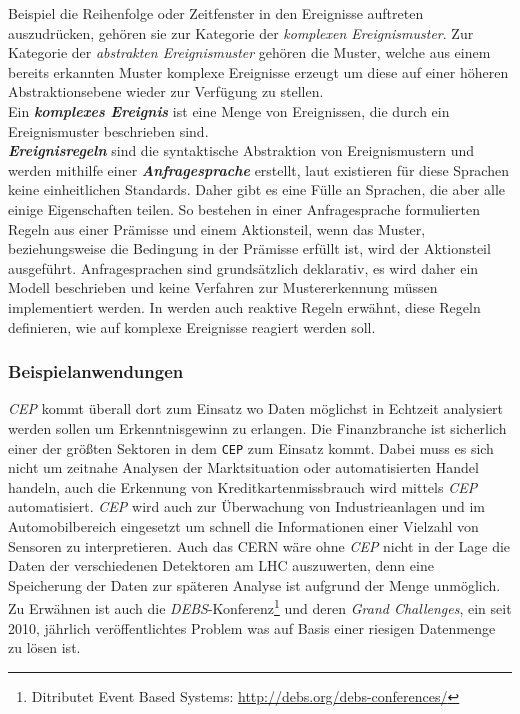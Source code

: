 \documentclass{acm_proc_article-sp}
\begin{document}
Beispiel die Reihenfolge oder Zeitfenster in den Ereignisse auftreten auszudrücken, 
gehören sie zur Kategorie der \textit{komplexen Ereignismuster}. Zur Kategorie der 
\textit{abstrakten Ereignismuster} gehören die Muster, welche aus einem bereits erkannten 
Muster komplexe Ereignisse erzeugt um diese auf einer höheren Abstraktionsebene wieder 
zur Verfügung zu stellen.\\
Ein \textbf{\textit{komplexes Ereignis}} ist eine Menge von Ereignissen, die durch ein 
Ereignismuster beschrieben sind.\\\label{begriff-ereignisregel}
\textbf{\textit{Ereignisregeln}} sind die syntaktische Abstraktion von Ereignismustern 
und werden mithilfe einer \textbf{\textit{Anfragesprache}} erstellt, laut \cite{bruns} 
existieren für diese 
Sprachen keine einheitlichen Standards. Daher gibt es eine Fülle an Sprachen, die aber 
alle einige Eigenschaften teilen. So bestehen in einer Anfragesprache formulierten 
Regeln aus einer Prämisse und einem Aktionsteil, wenn das Muster, beziehungsweise die 
Bedingung in der Prämisse erfüllt ist, wird der Aktionsteil ausgeführt. Anfragesprachen 
sind grundsätzlich deklarativ, es wird daher ein Modell beschrieben und keine Verfahren 
zur Mustererkennung müssen implementiert werden. In \cite{eckert} werden auch reaktive 
Regeln erwähnt, 
diese Regeln definieren, wie auf komplexe Ereignisse reagiert werden soll.

\subsubsection{Beispielanwendungen}
\vspace{0.1cm}

\textit{CEP} kommt überall dort zum Einsatz wo Daten möglichst in Echtzeit analysiert 
werden sollen um Erkenntnisgewinn zu erlangen. Die Finanzbranche ist sicherlich einer der 
größten Sektoren in dem \texttt{CEP} zum Einsatz kommt. Dabei muss es sich nicht um 
zeitnahe Analysen der Marktsituation oder automatisierten Handel handeln, auch die 
Erkennung von 
Kreditkartenmissbrauch wird mittels \textit{CEP} automatisiert. \textit{CEP} wird auch 
zur Überwachung von Industrieanlagen und im Automobilbereich eingesetzt um schnell die 
Informationen einer Vielzahl von Sensoren zu interpretieren. Auch das CERN wäre ohne 
\textit{CEP} nicht in der Lage die Daten der verschiedenen Detektoren am LHC auszuwerten, 
denn eine Speicherung der Daten zur späteren Analyse ist aufgrund der Menge unmöglich.\\
Zu Erwähnen ist auch die \textit{DEBS}-Konferenz\footnote{Ditributet Event Based Systems: 
\url{http://debs.org/debs-conferences/}} und deren \textit{Grand Challenges}, ein seit 
2010, jährlich veröffentlichtes Problem was auf Basis einer riesigen Datenmenge zu lösen 
ist.
\end{document}
